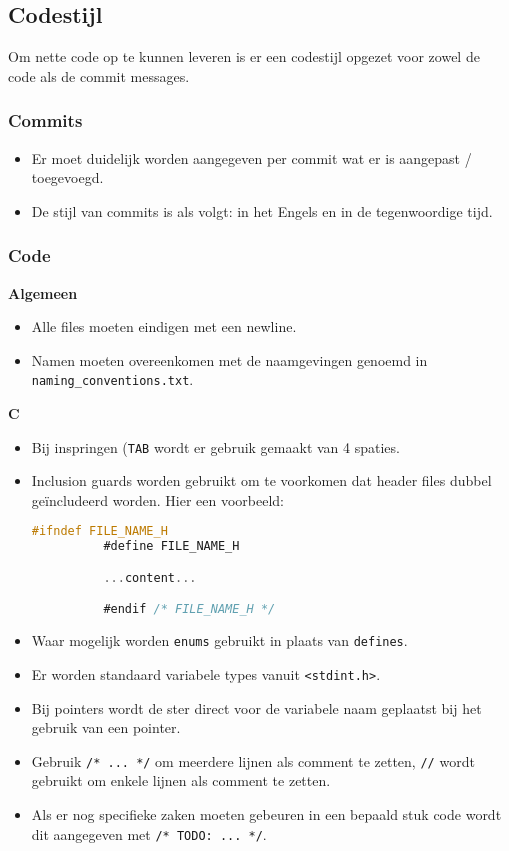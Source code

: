 \subsection{Codestijl}
Om nette code op te kunnen leveren is er een codestijl opgezet voor zowel 
de code als de commit messages.

\subsubsection{Commits}
\begin{itemize}
    \item Er moet duidelijk worden aangegeven per commit wat er is aangepast / 
          toegevoegd.
    \item De stijl van commits is als volgt: in het Engels en in de tegenwoordige
          tijd.
\end{itemize}

\subsubsection{Code}
\textbf{Algemeen}

\begin{itemize}
  \item Alle files moeten eindigen met een newline.
  \item Namen moeten overeenkomen met de naamgevingen genoemd in 
      \texttt{naming\_conventions.txt}.
\end{itemize}

\textbf{C}
\begin{itemize}
  \item Bij inspringen (\texttt{TAB} wordt er gebruik gemaakt van 4 spaties.
  \item Inclusion guards worden gebruikt om te voorkomen dat header files dubbel
        geïncludeerd worden. Hier een voorbeeld:
        \begin{lstlisting}[language=C,frame=single]
          #ifndef FILE_NAME_H
          #define FILE_NAME_H

          ...content...

          #endif /* FILE_NAME_H */
        \end{lstlisting}
  \item Waar mogelijk worden \texttt{enums} gebruikt in plaats van \texttt{defines}.
  \item Er worden standaard variabele types vanuit \texttt{<stdint.h>}.
  \item Bij pointers wordt de ster direct voor de variabele naam geplaatst
        bij het gebruik van een pointer.
  \item Gebruik \texttt{/* ... */} om meerdere lijnen als comment te zetten,
        \texttt{//} wordt gebruikt om enkele lijnen als comment te zetten.
  \item Als er nog specifieke zaken moeten gebeuren in een bepaald stuk code wordt
        dit aangegeven met \texttt{/* TODO: ... */}.
\end{itemize}

